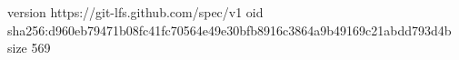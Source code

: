 version https://git-lfs.github.com/spec/v1
oid sha256:d960eb79471b08fc41fc70564e49e30bfb8916c3864a9b49169c21abdd793d4b
size 569
